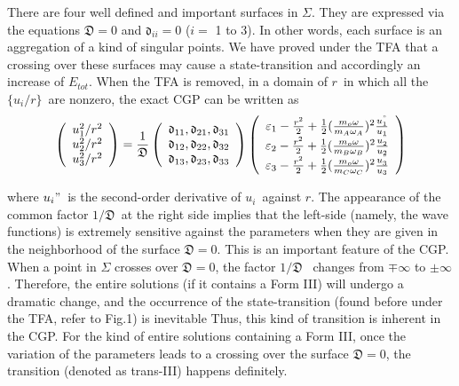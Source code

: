 \documentclass[single-column,showpacs,groupedaddress]{revtex4}
\begin{document}
There are four well defined and important surfaces in $\Sigma $. They are
expressed via the equations $\mathfrak{D}=0$ and $\mathfrak{d}_{ii}=0$ ($i=$%
1 to 3). In other words, each surface is an aggregation of a kind of
singular points. We have proved under the TFA that a crossing over these
surfaces may cause a state-transition and accordingly an increase of $%
E_{tot} $. When the TFA is removed, in a domain of $r$\ in which all the $%
\{u_{i}/r\} $\ are nonzero, the exact CGP can be written as
\begin{equation}
\left(
\begin{array}{c}
u_{1}^{2}/r^{2} \\
u_{2}^{2}/r^{2} \\
u_{3}^{2}/r^{2}%
\end{array}%
\right) =\frac{1}{\mathfrak{D}}\left(
\begin{array}{c}
\mathfrak{d}_{11},\mathfrak{d}_{21},\mathfrak{d}_{31} \\
\mathfrak{d}_{12},\mathfrak{d}_{22},\mathfrak{d}_{32} \\
\mathfrak{d}_{13},\mathfrak{d}_{23},\mathfrak{d}_{33}%
\end{array}%
\right) \left(
\begin{array}{c}
\varepsilon _{1}-\frac{r^{2}}{2}+\frac{1}{2}(\frac{m_{o}\omega }{m_{A}\omega
_{A}})^{2}\frac{u_{1}^{"}}{u_{1}} \\
\varepsilon _{2}-\frac{r^{2}}{2}+\frac{1}{2}(\frac{m_{o}\omega }{m_{B}\omega
_{B}})^{2}\frac{u_{2}^{"}}{u_{2}} \\
\varepsilon _{3}-\frac{r^{2}}{2}+\frac{1}{2}(\frac{m_{o}\omega }{m_{C}\omega
_{C}})^{2}\frac{u_{3}^{"}}{u_{3}}%
\end{array}%
\right)  \label{eqm}
\end{equation}

where $u_{i}"$\ is the second-order derivative of $u_{i}$\ against $r$. The
appearance of the common factor $1/\mathfrak{D}$\ at the right side implies
that the left-side (namely, the wave functions) is extremely sensitive
against the parameters when they are given in the neighborhood of the
surface $\mathfrak{D}=0$. This is an important feature of the CGP. When a
point in $\Sigma $ crosses over $\mathfrak{D}=0$, the factor $1/\mathfrak{D}$%
\ changes from $\mp \infty $ to $\pm \infty $. Therefore, the entire
solutions (if it contains a Form III) will undergo a dramatic change, and
the occurrence of the state-transition (found before under the TFA, refer to
Fig.1) is inevitable Thus, this kind of transition is inherent in the CGP.
For the kind of entire solutions containing a Form III, once the variation
of the parameters leads to a crossing over the surface $\mathfrak{D}=0$, the
transition (denoted as trans-III) happens definitely.
\end{document}
